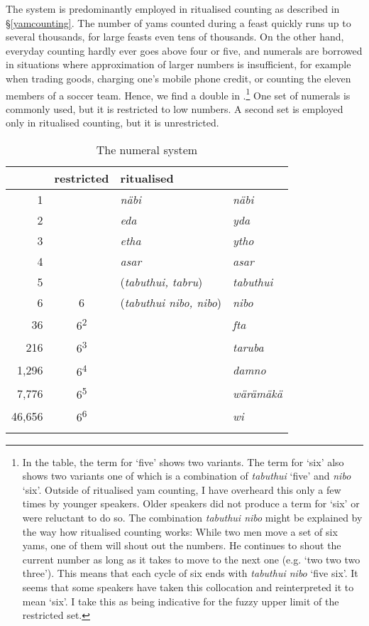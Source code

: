 The  system is predominantly employed in ritualised counting as described in {\S}\ref{yamcounting}. The number of yams counted during a feast quickly runs up to several thousands, for large feasts even tens of thousands. On the other hand, everyday counting hardly ever goes above four or five, and  numerals are borrowed in situations where approximation of larger numbers is insufficient, for example when trading goods, charging one's mobile phone credit, or counting the eleven members of a soccer team. Hence, we find a double  in .\footnote{In the table, the term for `five' shows two variants. The term for `six' also shows two variants one of which is a combination of \emph{tabuthui} `five' and \emph{nibo} `six'. Outside of ritualised yam counting, I have overheard this only a few times by younger speakers. Older speakers did not produce a term for `six' or were reluctant to do so. The combination \emph{tabuthui nibo} might be explained by the way how ritualised counting works: While two men move a set of six yams, one of them will shout out the numbers. He continues to shout the current number as long as it takes to move to the next one (e.g. `two two two three'). This means that each cycle of six ends with \emph{tabuthui nibo} `five six'. It seems that some speakers have taken this collocation and reinterpreted it to mean `six'. I take this as being indicative for the fuzzy upper limit of the restricted set.} One set of numerals is commonly used, but it is restricted to low numbers. A second set is employed only in ritualised counting, but it is unrestricted.

\begin{table}
\caption{The numeral system}
\label{numerals-table}
	\begin{tabularx}{.6\textwidth}{rp{1cm}ll}
		\lsptoprule
		\multicolumn{2}{c}{value}&{restricted}&{ritualised}\\\midrule
		1&&\emph{näbi}&\emph{näbi}\\
		2&&\emph{eda}&\emph{yda}\\
		3&&\emph{etha}&\emph{ytho}\\
		4&&\emph{asar}&\emph{asar}\\
		5&&(\emph{tabuthui, tabru})&\emph{tabuthui}\\
		6&\multicolumn{1}{c}{6}&(\emph{tabuthui nibo, nibo})&\emph{nibo}\\
		36&\multicolumn{1}{c}{6\textsuperscript{2}}&&\emph{fta}\\
		216&\multicolumn{1}{c}{6\textsuperscript{3}}&&\emph{taruba}\\
		1,296&\multicolumn{1}{c}{6\textsuperscript{4}}&&\emph{damno}\\
		7,776&\multicolumn{1}{c}{6\textsuperscript{5}}&&\emph{wärämäkä}\\
		46,656&\multicolumn{1}{c}{6\textsuperscript{6}}&&\emph{wi}\\
		\lspbottomrule
	\end{tabularx}
\end{table}%

